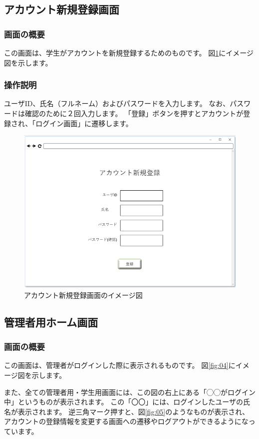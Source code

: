 \subsection{アカウント新規登録画面\label{creat_account}}
\subsubsection{画面の概要}
この画面は、学生がアカウントを新規登録するためのものです。
図\ref{fig:03}にイメージ図を示します。

\subsubsection{操作説明}
ユーザID、氏名（フルネーム）およびパスワードを入力します。
なお、パスワードは確認のために２回入力します。
「登録」ボタンを押すとアカウントが登録され、「ログイン画面」に遷移します。

\begin{figure}[htbp]
  \begin{center}
    \includegraphics[width=0.5\linewidth,clip]{./img/03.png}
    \caption{アカウント新規登録画面のイメージ図}\label{fig:03}
  \end{center}
\end{figure}

\newpage

\subsection{管理者用ホーム画面}
\subsubsection{画面の概要}
この画面は、管理者がログインした際に表示されるものです。
図\ref{fig:04}にイメージ図を示します。

また、全ての管理者用・学生用画面には、この図の右上にある「◯◯がログイン中」というものが表示されます。
この「〇〇」には、ログインしたユーザの氏名が表示されます。
逆三角マーク押すと、図\ref{fig:05}のようなものが表示され、
アカウントの登録情報を変更する画面への遷移やログアウトができるようになっています。

